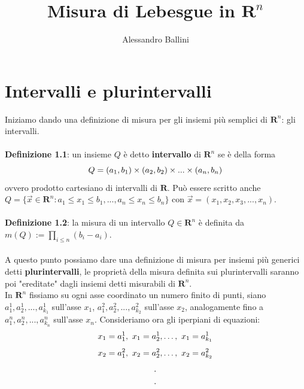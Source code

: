 \documentclass{article}
\title{Misura di Lebesgue in $\mathbf{R}^n$}
\author{Alessandro Ballini}
\date{}
\begin{document}
\maketitle

\tableofcontents
\newpage

\section{Intervalli e plurintervalli}
Iniziamo dando una definizione di misura per gli insiemi più semplici di $\mathbf{R}^n$: gli intervalli.\\ \\
\textbf{Definizione 1.1}: un insieme $Q$ è detto \textbf{intervallo} di $\mathbf{R}^n$ se è della forma
\begin{equation}
    Q = (a_1,b_1) \times (a_2,b_2) \times ... \times (a_n, b_n) \notag
\end{equation}
ovvero prodotto cartesiano di intervalli di $\mathbf{R}$. Può essere scritto anche $Q = \{ \vec{x} \in \mathbf{R}^n: a_1 \leq x_1 \leq b_1,..., a_n \leq x_n \leq b_n \}$ con $\vec{x} = (x_1,x_2,x_3,...,x_n)$.\\ \\
\textbf{Definizione 1.2}: la misura di un intervallo $Q \in \mathbf{R}^n$ è definita da $m(Q) := \prod_{i \leq n}(b_i - a_i)$.\\ \\
A questo punto possiamo dare una definizione di misura per insiemi più generici detti \textbf{plurintervalli}, le proprietà della misura definita sui plurintervalli saranno poi "ereditate" dagli insiemi detti misurabili di $\mathbf{R}^n$.\\
In $\mathbf{R}^n$ fissiamo su ogni asse coordinato un numero finito di punti, siano $a^1_1, a^1_2, ... , a^1_{k_1}$ sull'asse $x_1$, $a^2_1, a^2_2, ... , a^2_{k_2}$ sull'asse $x_2$, analogamente fino a $a^n_1, a^n_2, ... , a^n_{k_n}$ sull'asse $x_n$. Consideriamo ora gli iperpiani di equazioni:
\begin{equation}
    x_1 = a^1_1, \ x_1 = a^1_2, \dots , \ x_1 = a^1_{k_1} \notag
\end{equation}
\begin{equation}
    x_2 = a^2_1, \ x_2 = a^2_2, \dots , \ x_2 = a^2_{k_2} \notag
\end{equation}
\begin{align} \notag
    . \\ \notag
    . \\ \notag
\end{align}
\end{document}
